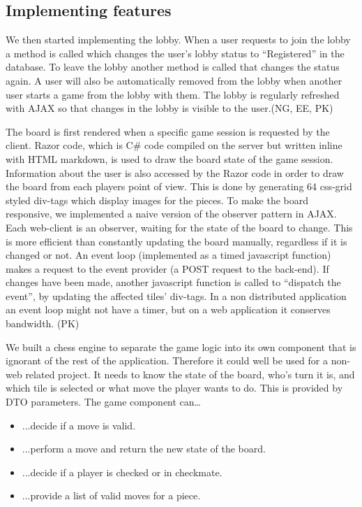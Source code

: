 \documentclass[acmlarge, review=false, screen=true]{acmart}
\begin{document}
  \subsection{Implementing features}
    We then started implementing the lobby. When a user requests to join the lobby a method is called which changes the user's lobby status to “Registered” in the database. To leave the lobby another method is called that changes the status again. A user will also be automatically removed from the lobby when another user starts a game from the lobby with them. The lobby is regularly refreshed with AJAX so that changes in the lobby is visible to the user.(NG, EE, PK)

    The board is first rendered when a specific game session is requested by the client. Razor code, which is C\# code compiled on the server but written inline with HTML markdown, is used to draw the board state of the game session\cite{razor}. Information about the user is also accessed by the Razor code in order to draw the board from each players point of view. This is done by generating 64 css-grid styled div-tags which display images for the pieces. To make the board responsive, we implemented a naive version of the observer pattern in AJAX\cite{ajax}. Each web-client is an observer, waiting for the state of the board to change. This is more efficient than constantly updating the board manually, regardless if it is changed or not. An event loop (implemented as a timed javascript function) makes a request to the event provider (a POST request to the back-end)\cite{event-loop}. If changes have been made, another javascript function is called to “dispatch the event”, by updating the affected tiles’ div-tags. In a non distributed application an event loop might not have a timer, but on a web application it conserves bandwidth. (PK)

    We built a chess engine to separate the game logic into its own component that is ignorant of the rest of the application. Therefore it could well be used for a non-web related project. It needs to know the state of the board, who’s turn it is, and which tile is selected or what move the player wants to do. This is provided by DTO parameters. The game component can… 
    \begin{itemize}
      \item ...decide if a move is valid.
      \item ...perform a move and return the new state of the board.
      \item ...decide if a player is checked or in checkmate.
      \item ...provide a list of valid moves for a piece.
    \end{itemize}
    
\end{document}
